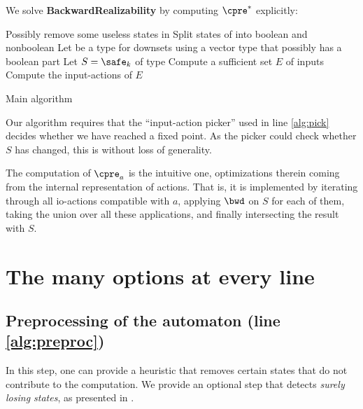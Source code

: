 \documentclass[runningheads,a4paper]{llncs}
\begin{document}
We
solve \textbf{BackwardRealizability} by computing
\(\cpre^*\) explicitly:

\begin{algorithm}[H]
  \LinesNumbered
{}

\BlankLine

Possibly remove some useless states in \cA\;\label{alg:preproc}
Split states of \cA into boolean and nonboolean\;\label{alg:bool}
Let \Downset be a type for downsets using a vector type that possibly has a
boolean part\;\label{alg:types}
Let \(S = \safe_k\) of type \Downset\;
Compute a sufficient set \(E\) of  inputs\;\label{alg:inputs}
Compute the input-actions of \(E\)\;\label{alg:actions}
\caption{Main algorithm}\label{main_algo}
\end{algorithm}

Our algorithm requires that the ``input-action picker'' used in line \ref{alg:pick}
decides whether we have reached a fixed point.  As the picker could check
whether \(S\) has changed, this is without loss of generality.

The computation of \(\cpre_a\) is the intuitive one, optimizations therein coming
from the internal representation of actions.  That is, it is implemented by
iterating through all io-actions compatible with \(a\), applying \(\bwd\) on
\(S\) for each of them, taking the union over all these applications, and finally
intersecting the result with \(S\).

\section{The many options at every line}\label{sec:implem}

\subsection{Preprocessing of the automaton (line \ref{alg:preproc})}\label{sec:preproc}

In this step, one can provide a heuristic that removes certain states that
do not contribute to the computation.  We provide an optional step that
detects \emph{surely losing states}, as presented in \cite{ggs14}.
\end{document}
